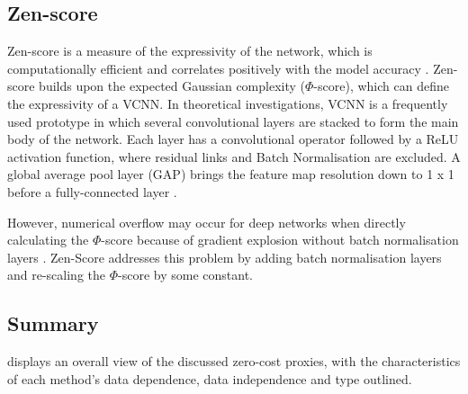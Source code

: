 \subsection{Zen-score}
Zen-score is a measure of the expressivity of the network, which is computationally efficient and correlates positively with the model accuracy \autocite{lin2021zen}. Zen-score builds upon the expected Gaussian complexity ($\Phi$-score), which can define the expressivity of a \Gls{VCNN}. In theoretical investigations, \gls{VCNN} is a frequently used prototype in which several convolutional layers are stacked to form the main body of the network. Each layer has a convolutional operator followed by a ReLU activation function, where residual links and Batch Normalisation are excluded. A global average pool layer (GAP) brings the feature map resolution down to 1 x 1 before a fully-connected layer  \autocite{lin2021zen}.  

However, numerical overflow may occur for deep networks when directly calculating the $\Phi$-score because of gradient explosion without batch normalisation layers \autocite{lin2021zen}. Zen-Score addresses this problem by adding batch normalisation layers and re-scaling the $\Phi$-score by some constant. 

\subsection{Summary}

 displays an overall view of the discussed zero-cost proxies, with the characteristics of each method's data dependence, data independence and type outlined. 

